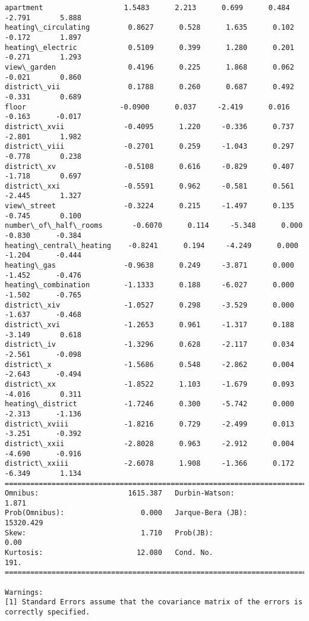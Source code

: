 \documentclass[11pt]{article}
\begin{document}
\begin{Verbatim}[commandchars=\\\{\}]
apartment                   1.5483      2.213      0.699      0.484      -2.791       5.888
heating\_circulating         0.8627      0.528      1.635      0.102      -0.172       1.897
heating\_electric            0.5109      0.399      1.280      0.201      -0.271       1.293
view\_garden                 0.4196      0.225      1.868      0.062      -0.021       0.860
district\_vii                0.1788      0.260      0.687      0.492      -0.331       0.689
floor                      -0.0900      0.037     -2.419      0.016      -0.163      -0.017
district\_xvii              -0.4095      1.220     -0.336      0.737      -2.801       1.982
district\_viii              -0.2701      0.259     -1.043      0.297      -0.778       0.238
district\_xv                -0.5108      0.616     -0.829      0.407      -1.718       0.697
district\_xxi               -0.5591      0.962     -0.581      0.561      -2.445       1.327
view\_street                -0.3224      0.215     -1.497      0.135      -0.745       0.100
number\_of\_half\_rooms       -0.6070      0.114     -5.348      0.000      -0.830      -0.384
heating\_central\_heating    -0.8241      0.194     -4.249      0.000      -1.204      -0.444
heating\_gas                -0.9638      0.249     -3.871      0.000      -1.452      -0.476
heating\_combination        -1.1333      0.188     -6.027      0.000      -1.502      -0.765
district\_xiv               -1.0527      0.298     -3.529      0.000      -1.637      -0.468
district\_xvi               -1.2653      0.961     -1.317      0.188      -3.149       0.618
district\_iv                -1.3296      0.628     -2.117      0.034      -2.561      -0.098
district\_x                 -1.5686      0.548     -2.862      0.004      -2.643      -0.494
district\_xx                -1.8522      1.103     -1.679      0.093      -4.016       0.311
heating\_district           -1.7246      0.300     -5.742      0.000      -2.313      -1.136
district\_xviii             -1.8216      0.729     -2.499      0.013      -3.251      -0.392
district\_xxii              -2.8028      0.963     -2.912      0.004      -4.690      -0.916
district\_xxiii             -2.6078      1.908     -1.366      0.172      -6.349       1.134
==============================================================================
Omnibus:                     1615.387   Durbin-Watson:                   1.871
Prob(Omnibus):                  0.000   Jarque-Bera (JB):            15320.429
Skew:                           1.710   Prob(JB):                         0.00
Kurtosis:                      12.080   Cond. No.                         191.
==============================================================================

Warnings:
[1] Standard Errors assume that the covariance matrix of the errors is correctly specified.

    \end{Verbatim}
\end{document}
